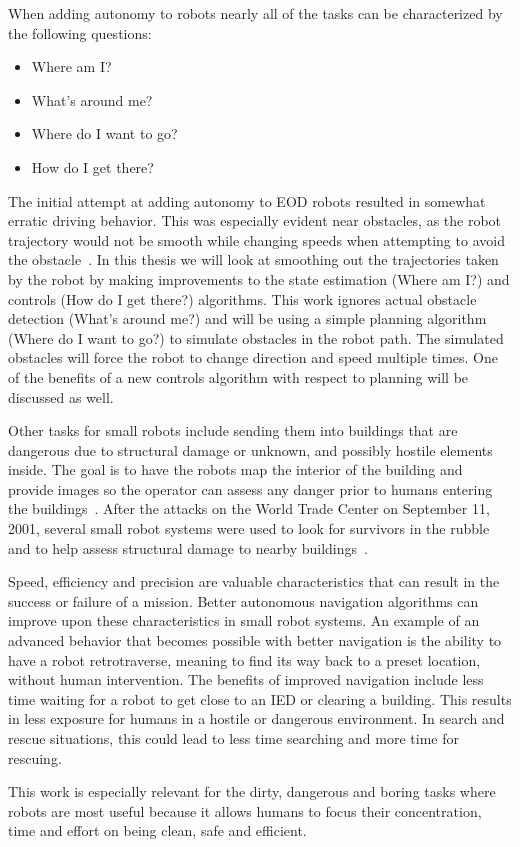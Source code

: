 When adding autonomy to robots nearly all of the tasks can be characterized by the following questions:
\begin{itemize}
\item Where am I\@?
\item What's around me?
\item Where do I want to go?
\item How do I get there?
\end{itemize}

The initial attempt at adding autonomy to EOD robots resulted in somewhat erratic driving behavior.
This was especially evident near obstacles, as the robot trajectory would not be smooth while changing speeds when attempting to avoid the obstacle~\cite{Bruch00}.
In this thesis we will look at smoothing out the trajectories taken by the robot by making improvements to the state estimation (Where am I?) and controls (How do I get there?) algorithms.
This work ignores actual obstacle detection (What's around me?) and will be using a simple planning algorithm (Where do I want to go?) to simulate obstacles in the robot path.
The simulated obstacles will force the robot to change direction and speed multiple times.
One of the benefits of a new controls algorithm with respect to planning will be discussed as well.

Other tasks for small robots include sending them into buildings that are dangerous due to structural damage or unknown, and possibly hostile elements inside.
The goal is to have the robots map the interior of the building and provide images so the operator can assess any danger prior to humans entering the buildings~\cite{CongressUGV06}.
After the attacks on the World Trade Center on September 11, 2001, several small robot systems were used to look for survivors in the rubble and to help assess structural damage to nearby buildings~\cite{Everett02}.

Speed, efficiency and precision are valuable characteristics that can result in the success or failure of a mission.
Better autonomous navigation algorithms can improve upon these characteristics in small robot systems.
An example of an advanced behavior that becomes possible with better navigation is the ability to have a robot retrotraverse, meaning to find its way back to a preset location, without human intervention.
The benefits of improved navigation include less time waiting for a robot to get close to an IED or clearing a building.
This results in less exposure for humans in a hostile or dangerous environment.
In search and rescue situations, this could lead to less time searching and more time for rescuing.

This work is especially relevant for the dirty, dangerous and boring tasks where robots are most useful because it allows humans to focus their concentration, time and effort on being clean, safe and efficient.
